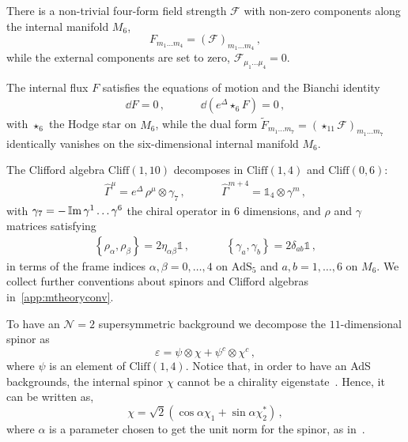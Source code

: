 \documentclass[debug]{phd}
\begin{document}
There is a non-trivial four-form field strength $\mathcal{F}$ with non-zero components along the internal manifold $M_6$, 
%
	\begin{equation}
		F_{m_1 \ldots m_4} = \left(\mathcal{F}\right)_{m_1 \ldots m_4}\, ,
	\end{equation}
%
while the external components are set to zero, $\mathcal{F}_{\mu_1 \ldots \mu_4} = 0$.

The internal flux $F$ satisfies the equations of motion and the Bianchi identity
%
	\begin{equation}
		\begin{array}{ccccc}
			\dd  F = 0\, , & & & & \dd  (e^\Delta \star_6 F) = 0\, , 
		\end{array}
	\end{equation}
%
with $\star_6$ the Hodge star on $M_6$, while the dual form $\tilde{F}_{m_1 \ldots m_7} = \left(\star_{11}\mathcal{F}\right)_{m_1 \ldots m_7}$ identically vanishes on the six-dimensional internal manifold $M_6$.

The Clifford algebra $\mathrm{Cliff}(1,10)$ decomposes in $\mathrm{Cliff}(1,4)$ and $\mathrm{Cliff}(0,6)$:
%
	\begin{equation}
	\label{eq:dec_gammas_m6}
		\begin{array}{ccc}
			\hat{\Gamma}^\mu = e^{\Delta}\,\rho^\mu \otimes \gamma_7\, , & \phantom{and} &\hat{\Gamma}^{m+4} = \mathds{1}_4 \otimes \gamma^m\, ,
		\end{array}
	\end{equation}
%
with $\gamma_7 = - \operatorname{\mathbb{I}m} \gamma^1 \ldots \gamma^6$ the chiral operator in $6$ dimensions, and $\rho$ and $\gamma$ matrices satisfying
%
	\begin{equation}
	\label{eq:cliff}
		\begin{array}{ccc}
			\left\{\rho_\alpha , \rho_\beta \right\} = 2 \eta_{\alpha \beta} \mathds{1}\, , & \phantom{and} &\left\{\gamma_{a} , \gamma_b \right\} = 2 \delta_{ab} \mathds{1}\, ,
		\end{array}
	\end{equation}
%
in terms of the frame indices $\alpha ,\beta = 0,\ldots,4$ on $\mathrm{AdS}_5$ and $a,b = 1, \ldots, 6$ on $M_6$. We collect further conventions about spinors and Clifford algebras in~\cref{app:mtheoryconv}.
%

To have an $\mathcal{N}=2$ supersymmetric background we decompose the $11$-dimensional spinor as
%
	\begin{equation}
	\label{eq:decomp_mtheory_spinors}
		\varepsilon = \psi \otimes \chi + \psi^c \otimes \chi^c\, ,
	\end{equation}
where $\psi$ is an element of $\mathrm{Cliff}(1,4)$. 
Notice that, in order to have an AdS backgrounds, the internal spinor $\chi$ cannot be a chirality eigenstate~\cite{Gauntlett:2004zh}. 
Hence, it can be written as,
%
	\begin{equation}
	\label{chiredef}
		\chi = \sqrt{2} \left(\cos \alpha  \chi_1 + \sin \alpha  \chi_2^* \right)\, ,
	\end{equation}
%
where $\alpha $ is a parameter chosen to get the unit norm for the spinor, as in~\cite{Gauntlett:2004zh}.\\
\end{document}
